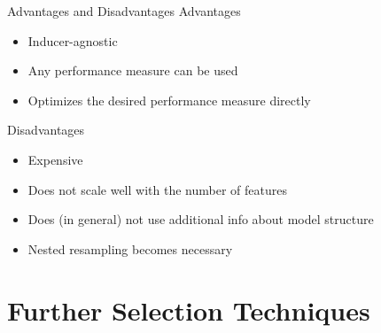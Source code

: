 \documentclass[11pt,compress,t,notes=noshow, xcolor=table]{beamer}
\begin{document}
\begin{frame}{}
 
\end{frame}

\begin{frame}{}
 
\end{frame}

\begin{frame}{}
 
\end{frame}

\begin{frame}{}
 
\end{frame}

\begin{frame}{Advantages and Disadvantages}
    Advantages
    \begin{itemize}
        \item Inducer-agnostic
        \item Any performance measure can be used
        \item Optimizes the desired performance measure directly
    \end{itemize}
    Disadvantages
    \begin{itemize}
        \item Expensive
        \item Does not scale well with the number of features
        \item Does (in general) not use additional info about model structure
        \item Nested resampling becomes necessary
    \end{itemize}
    
\end{frame}

\section{Further Selection Techniques}
\end{document}
